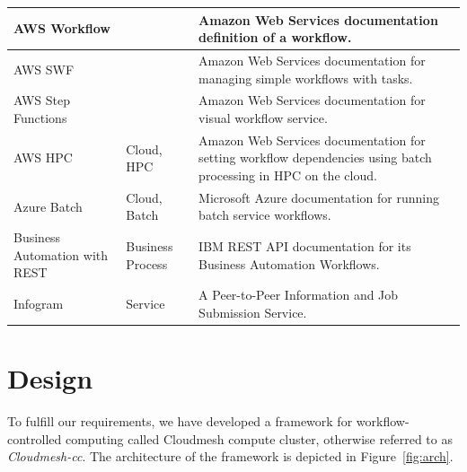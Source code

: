 \begin{table}[htb]
{{\begin{tabular}{|p{3cm}|p{3cm}|p{10cm}|}
AWS Workflow \cite{www-aws-workflow} & & Amazon Web Services documentation definition of a workflow.\\
\hline

AWS SWF \cite{www-aws-swf} & & Amazon Web Services documentation for managing simple workflows with tasks. \\
\hline

AWS Step Functions \cite{www-aws-stepfunctions} & & Amazon Web Services documentation for visual workflow service. \\
\hline

AWS HPC  \cite{www-aws-batch-workflow} & Cloud, HPC & Amazon Web Services documentation for setting workflow dependencies using batch processing in HPC on the cloud. \\
\hline

Azure Batch \cite{www-azure-batch} & Cloud, Batch & Microsoft Azure documentation for running batch service workflows. \\
  \hline

 Business Automation with REST \cite{www-business-rest-ibm} & Business
                                        Process& IBM REST API documentation for its Business Automation Workflows. \\
\hline

  


Infogram \cite{las-02-infogram} & Service & A Peer-to-Peer Information and Job Submission Service.\\
\hline
\end{tabular}
}
}
\end{table}

% 


\section{Design}

To fulfill our requirements, we have developed a framework for
workflow-controlled computing called Cloudmesh compute cluster,
otherwise referred to as {\em Cloudmesh-cc}. The architecture of the
framework is depicted in Figure~\ref{fig:arch}.

